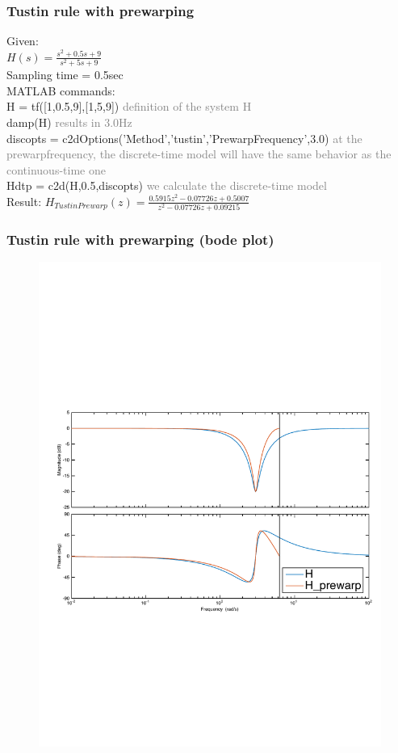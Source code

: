 \begin{frame}
	\frametitle{Tustin rule with prewarping}
	\begin{example}
		Given:\\
		$H(s) = \frac{s^{2} + 0.5s + 9}{s^{2} + 5s + 9}$\\
		Sampling time = 0.5sec\\
		\vspace{1em}
		MATLAB commands:\\
		H = tf([1,0.5,9],[1,5,9])	\textcolor{gray}{definition of the system H} \\
		damp(H)	\textcolor{gray}{results in 3.0Hz} \\
		discopts = c2dOptions('Method','tustin','PrewarpFrequency',3.0)	\textcolor{gray}{at the prewarpfrequency, the discrete-time model will have the same behavior as the continuous-time one}\\
		Hdtp = c2d(H,0.5,discopts)	\textcolor{gray}{we calculate the discrete-time model}\\
		\vspace{1em}
		Result:
		$H_{TustinPrewarp}(z) = \frac{0.5915z^{2} - 0.07726z + 0.5007}{z^{2} - 0.07726z + 0.09215}$
	\end{example}
\end{frame}

\begin{frame}
	\frametitle{Tustin rule with prewarping (bode plot)}
	\vspace{-0.7em}
	\begin{figure}
		\centering
		\includegraphics[width=1\linewidth]{distortion_bode3}
	\end{figure}
\end{frame}